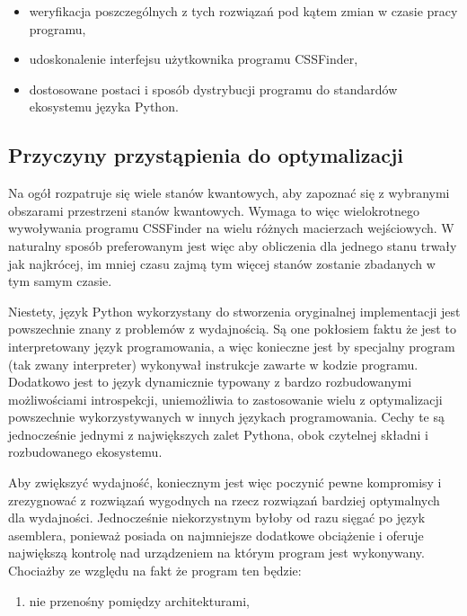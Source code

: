 \documentclass[11pt, a4paper]{article}
\begin{document}
\begin{sloppypar}
\begin{itemize}
      \item weryfikacja poszczególnych z tych rozwiązań pod kątem zmian w czasie pracy programu,

      \item udoskonalenie interfejsu użytkownika programu CSSFinder,

      \item dostosowane postaci i sposób dystrybucji programu do standardów ekosystemu języka
        Python.
    \end{itemize}

    \subsection{Przyczyny przystąpienia do optymalizacji}
    Na ogół rozpatruje się wiele stanów kwantowych, aby zapoznać się z wybranymi obszarami
    przestrzeni stanów kwantowych. Wymaga to więc wielokrotnego wywoływania programu
    CSSFinder na wielu różnych macierzach wejściowych. W naturalny sposób preferowanym jest
    więc aby obliczenia dla jednego stanu trwały jak najkrócej, im mniej czasu zajmą tym
    więcej stanów zostanie zbadanych w tym samym czasie.

    Niestety, język Python wykorzystany do stworzenia oryginalnej implementacji jest powszechnie
    znany z problemów z wydajnością. Są one pokłosiem faktu że jest to interpretowany
    język programowania, a więc konieczne jest by specjalny program (tak zwany
    interpreter) wykonywał instrukcje zawarte w kodzie programu. Dodatkowo jest to język
    dynamicznie typowany z bardzo rozbudowanymi możliwościami introspekcji, uniemożliwia
    to zastosowanie wielu z optymalizacji powszechnie wykorzystywanych w innych językach
    programowania. Cechy te są jednocześnie jednymi z największych zalet Pythona, obok czytelnej
    składni i rozbudowanego ekosystemu.

    Aby zwiększyć wydajność, koniecznym jest więc poczynić pewne kompromisy i
    zrezygnować z rozwiązań wygodnych na rzecz rozwiązań bardziej optymalnych dla
    wydajności. Jednocześnie niekorzystnym byłoby od razu sięgać po język asemblera,
    ponieważ posiada on najmniejsze dodatkowe obciążenie i oferuje największą kontrolę
    nad urządzeniem na którym program jest wykonywany. Chociażby ze względu na fakt że program
    ten będzie:

    \begin{enumerate}
      \item nie przenośny pomiędzy architekturami,


\end{enumerate}
\end{sloppypar}
\end{document}

